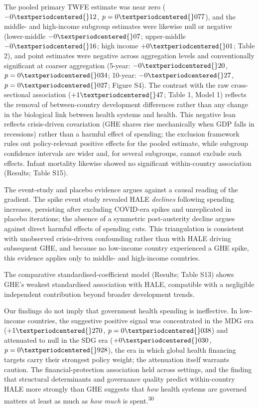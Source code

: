 \documentclass[12pt,a4paper]{article}
\begin{document}
The pooled primary TWFE estimate was near zero ($-0{\textperiodcentered{}}12$, $p = 0{\textperiodcentered{}}077$), and the middle- and high-income subgroup estimates were likewise null or negative (lower-middle $-0{\textperiodcentered{}}07$; upper-middle $-0{\textperiodcentered{}}16$; high income $+0{\textperiodcentered{}}01$; Table 2), and point estimates were negative across aggregation levels and conventionally significant at coarser aggregation (5-year: $-0{\textperiodcentered{}}20$, $p = 0{\textperiodcentered{}}034$; 10-year: $-0{\textperiodcentered{}}27$, $p = 0{\textperiodcentered{}}027$; Figure S4). The contrast with the raw cross-sectional association ($+1{\textperiodcentered{}}47$; Table 1, Model 1) reflects the removal of between-country development differences rather than any change in the biological link between health systems and health. This negative lean reflects crisis-driven covariation (GHE shares rise mechanically when GDP falls in recessions) rather than a harmful effect of spending; the exclusion framework rules out policy-relevant positive effects for the pooled estimate, while subgroup confidence intervals are wider and, for several subgroups, cannot exclude such effects. Infant mortality likewise showed no significant within-country association (Results; Table S15).

The event-study and placebo evidence argues against a causal reading of the gradient. The spike event study revealed HALE \textit{declines} following spending increases, persisting after excluding COVID-era spikes and unreplicated in placebo iterations; the absence of a symmetric post-austerity decline argues against direct harmful effects of spending cuts. This triangulation is consistent with unobserved crisis-driven confounding rather than with HALE driving subsequent GHE, and because no low-income country experienced a GHE spike, this evidence applies only to middle- and high-income countries.

The comparative standardised-coefficient model (Results; Table S13) shows GHE's weakest standardised association with HALE, compatible with a negligible independent contribution beyond broader development trends.

Our findings do not imply that government health spending is ineffective. In low-income countries, the suggestive positive signal was concentrated in the MDG era ($+1{\textperiodcentered{}}270$, $p = 0{\textperiodcentered{}}038$) and attenuated to null in the SDG era ($+0{\textperiodcentered{}}030$, $p = 0{\textperiodcentered{}}928$), the era in which global health financing targets carry their strongest policy weight; the attenuation itself warrants caution. The financial-protection association held across settings, and the finding that structural determinants and governance quality predict within-country HALE more strongly than GHE suggests that \textit{how} health systems are governed matters at least as much as \textit{how much} is spent.\textsuperscript{30}
\end{document}
